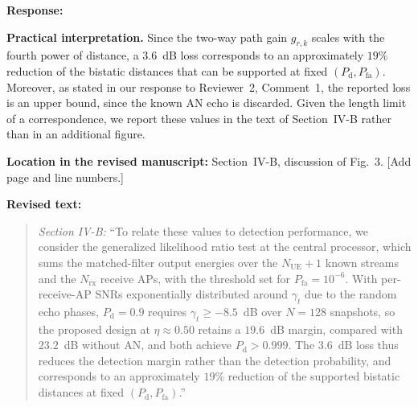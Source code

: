 \documentclass[a4paper,12pt]{article}
\newenvironment{response}{\par\textbf{Response:}\par}{\par}
\newcommand{\revisionlocation}[1]{\par\textbf{Location in the revised manuscript:} #1\par}
\newenvironment{revisedtext}{%
  \par\textbf{Revised text:}\begin{quote}\color{red}
}{\end{quote}}
\begin{document}
\begin{response}
\textbf{Practical interpretation.} Since the two-way path gain $g_{r,k}$
scales with the fourth power of distance, a $3.6$~dB loss corresponds to an
approximately $19\%$ reduction of the bistatic distances that can be
supported at fixed $(P_{\mathrm{d}},P_{\mathrm{fa}})$. Moreover, as stated in
our response to Reviewer~2, Comment~1, the reported loss is an upper bound,
since the known AN echo is discarded. Given the length limit of a
correspondence, we report these values in the text of Section~IV-B rather
than in an additional figure.
\end{response}
\revisionlocation{Section~IV-B, discussion of Fig.~3. [Add page and line
numbers.]}
\begin{revisedtext}
\textit{Section IV-B:} ``To relate these values to detection performance, we
consider the generalized likelihood ratio test at the central processor,
which sums the matched-filter output energies over the $N_{\mathrm{UE}}+1$
known streams and the $N_{\mathrm{rx}}$ receive APs, with the threshold set
for $P_{\mathrm{fa}}=10^{-6}$. With per-receive-AP SNRs exponentially
distributed around $\gamma_t$ due to the random echo phases,
$P_{\mathrm{d}}=0.9$ requires $\gamma_t\ge-8.5$~dB over $N=128$ snapshots,
so the proposed design at $\eta\approx0.50$ retains a $19.6$~dB margin,
compared with $23.2$~dB without AN, and both achieve
$P_{\mathrm{d}}>0.999$. The $3.6$~dB loss thus reduces the detection margin
rather than the detection probability, and corresponds to an approximately
$19\%$ reduction of the supported bistatic distances at fixed
$(P_{\mathrm{d}},P_{\mathrm{fa}})$.''
\end{revisedtext}
\end{document}
